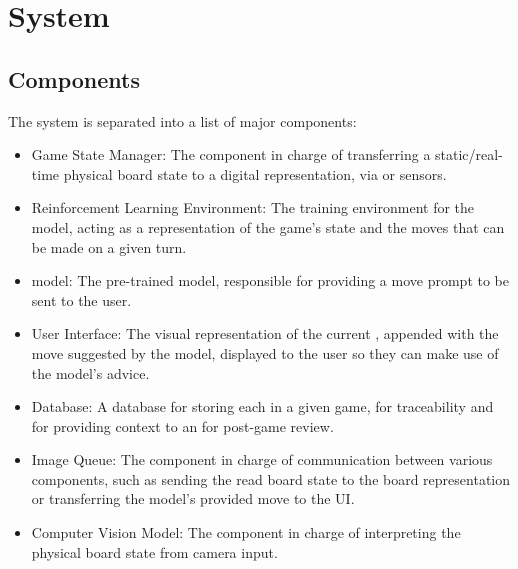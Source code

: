 \documentclass{article}
\begin{document}
    
    
\newpage{}




\section*{System}\label{sec:srs-system}
\renewcommand{\thesubsection}{S.\arabic{subsection}}
\renewcommand{\theHsubsection}{S.\arabic{subsection}}
\setcounter{subsection}{0}

\subsection{Components}\label{subsec:components}
The system is separated into a list of major components:

\begin{itemize}
    \item Game State Manager: The component
    in charge of transferring a static/real-time physical board state to a 
    digital representation, via \CV{} or sensors.

    \item Reinforcement Learning Environment: The training
    environment for the model, acting as a representation of the game's state and the
    moves that can be made on a given turn.

    \item \AI{} model: The pre-trained model,
    responsible for providing a move prompt to be sent to the user.

    \item User Interface: The visual
    representation of the current \GameState{}, appended with the move suggested by
    the model, displayed to the user so they can make use of the model's advice.

    \item \GameState{} Database: A database for
    storing each \GameState{} in a given game, for traceability and for providing
    context to an \LLM{} for post-game review.

    \item Image Queue: The component
    in charge of communication between various components, such as sending the read
    board state to the board representation or transferring the model's provided
    move to the UI\@.

    \item Computer Vision Model: The component
    in charge of interpreting the physical board state from camera input.
\end{itemize}
\end{document}
